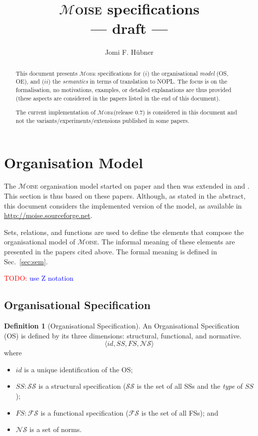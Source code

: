 \documentclass{article}
\newcommand{\moise}{{$\mathcal{M}$\textsc{oise}}\xspace}
\newcommand{\todo}[1]{\textcolor{red}{TODO: }\textcolor{blue}{#1}}
\newcommand{\set}[1]{\mathcal{#1}}
\theoremstyle{definition} \newtheorem{definition}{Definition}
\begin{document}
\title{\moise specifications \\ --- draft ---}
\author{Jomi F. H\"ubner}
\maketitle

\begin{abstract}
  This document presents \moise specifications for ($i$) the
  organisational \emph{model} (OS, OE), and ($ii$) the
  \emph{semantics} in terms of translation to NOPL. The focus is on
  the formalisation, no motivations, examples, or detailed
  explanations are thus provided (these aspects are considered in the
  papers listed in the end of this document).

  The current implementation of \moise (release 0.7) is considered in
  this document and not the variants/experiments/extensions
  published in some papers.
\end{abstract}


\newpage
\tableofcontents
\newpage


\section{Organisation Model}

The \moise organisation model started on paper \cite{hannoun:02} and
then was extended in \cite{hubner:02b} and \cite{gateau:eumas05}. This
section is thus based on these papers. Although, as stated in the
abstract, this document considers the implemented version of the
model, as available in \url{http://moise.sourceforge.net}.

Sets, relations, and functions are used to define the elements that
compose the organisational model of \moise. The informal meaning of
these elements are presented in the papers cited above. The formal
meaning is defined in Sec.~\ref{sec:sem}.

\todo{use Z notation}
 
\subsection{Organisational Specification}
 

\begin{definition}[Organisational Specification]
  An Organisational Specification (OS) is defined by its three
  dimensions: structural, functional, and normative. 
  \begin{displaymath}
    \langle id, SS, FS, \set{NS} \rangle    
  \end{displaymath}
  where
  \begin{itemize}
  \item $id$ is a unique identification of the OS;
  \item $SS : \set{SS}$ is a structural specification ($\set{SS}$ is
    the set of all SSs and the \emph{type} of $SS$);
  \item $FS : \set{FS}$ is a functional specification ($\set{FS}$ is
    the set of all FSs); and
  \item $\set{NS}$ is a set of norms.
  \end{itemize}
\end{definition}
\end{document}
